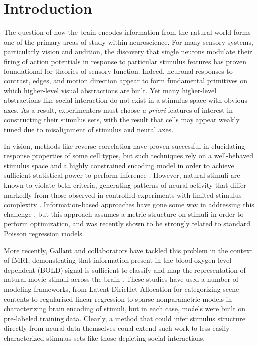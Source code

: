 \documentclass{nature}
\begin{document}
\linenumbers

\section*{Introduction}
The question of how the brain encodes information from the natural world forms one of the primary areas of study within neuroscience. For many sensory systems, particularly vision and audition, the discovery that single neurons modulate their firing of action potentials in response to particular stimulus features has proven foundational for theories of sensory function. Indeed, neuronal responses to contrast, edges, and motion direction appear to form fundamental primitives on which higher-level visual abstractions are built. Yet many higher-level abstractions like social interaction do not exist in a stimulus space with obvious axes. As a result, experimenters must choose \emph{a priori} features of interest in constructing their stimulus sets, with the result that cells may appear weakly tuned due to misalignment of stimulus and neural axes.

In vision, methods like reverse correlation have proven successful in elucidating response properties of some cell types, but such techniques rely on a well-behaved stimulus space and a highly constrained encoding model in order to achieve sufficient statistical power to perform inference \cite{steveninck1988realtime,ringach2004reverse,ringach2002receptive}. However, natural stimuli are known to violate both criteria, generating patterns of neural activity that differ markedly from those observed in controlled experiments with limited stimulus complexity \cite{ringach2002receptive,sharpee2004analyzing,Vinje2000-dx}. Information-based approaches have gone some way in addressing this challenge \cite{sharpee2004analyzing}, but this approach assumes a metric structure on stimuli in order to perform optimization, and was recently shown to be strongly related to standard Poisson regression models\cite{Williamson2013-rg}.

More recently, Gallant and collaborators have tackled this problem in the context of fMRI, demonstrating that information present in the blood oxygen level-dependent (BOLD) signal is sufficient to classify and map the representation of natural movie stimuli across the brain \cite{Vu2011-da,Huth2012-cj,Stansbury2013-nm}. These studies have used a number of modeling frameworks, from Latent Dirichlet Allocation for categorizing scene contents \cite{Stansbury2013-nm} to regularized linear regression \cite{Huth2012-cj} to sparse nonparametric models \cite{Vu2011-da} in characterizing brain encoding of stimuli, but in each case, models were built on pre-labeled training data. Clearly, a method that could infer stimulus structure directly from neural data themselves could extend such work to less easily characterized stimulus sets like those depicting social interactions.
\end{document}
